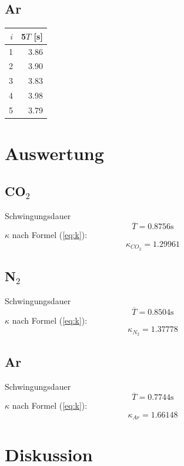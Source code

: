 \documentclass[12pt,a4paper]{article}
\begin{document}
\subsection*{Ar}
\begin{tabular}{|r|r|}
\hline
$i$&5$T$ [s]\\
\hline
1&3.86 \\
2&3.90 \\
3&3.83 \\
4&3.98 \\
5&3.79 \\
\hline
\end{tabular}

\section*{Auswertung}
\subsection*{CO$_2$}
Schwingungsdauer
\[ \overline{T} = 0.8756\mbox{s} \]
$\kappa$ nach Formel (\ref{eq:k}):
\[ \kappa_{CO_2} = 1.29961 \]

\subsection*{N$_2$}
Schwingungsdauer
\[ \overline{T} = 0.8504\mbox{s} \]
$\kappa$ nach Formel (\ref{eq:k}):
\[ \kappa_{N_2} = 1.37778 \]

\subsection*{Ar}
Schwingungsdauer
\[ \overline{T} = 0.7744\mbox{s} \]
$\kappa$ nach Formel (\ref{eq:k}):
\[ \kappa_{Ar} = 1.66148 \]

\section*{Diskussion}
\end{document}
